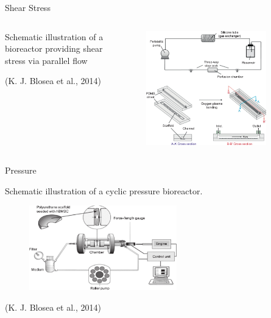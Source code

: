 \documentclass[11pt,t]{beamer}
\begin{document}
\begin{frame}[fragile]{Shear Stress}  
	
	\begin{columns}[t]
		\begin{column}{.40\textwidth}
		 	Schematic illustration of a bioreactor providing shear stress via parallel flow
		 	
		\vspace{90pt}
		\footnotesize(K. J. Blosea et al., 2014)
 
		\end{column}
		\begin{column}{.60\textwidth}
			\vspace{-45pt}
			\begin{figure}
			\centering
			\includegraphics[width=0.85\textwidth]{mech_shear}
			
			\end{figure}
		\end{column}
	\end{columns}	
		

\end{frame}


\begin{frame}[fragile]{Pressure}  

		 	Schematic illustration of a cyclic pressure bioreactor.

			\begin{figure}
			\centering
			\includegraphics[width=0.57\textwidth]{mech_pressure}
			
			\end{figure}
	\footnotesize(K. J. Blosea et al., 2014)

\end{frame}
\end{document}
